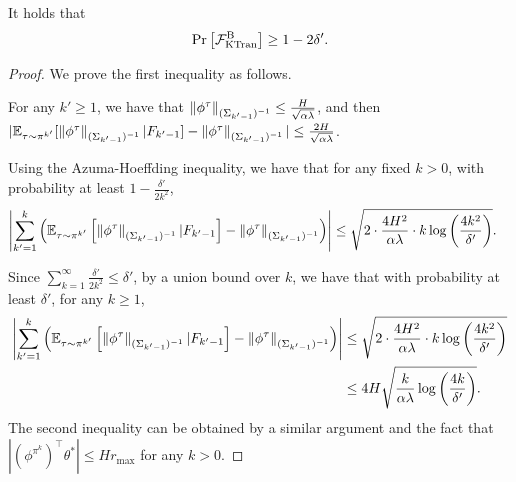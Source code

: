 \begin{lemma} \label{lemma:cF_binary}
	It holds that
	\begin{align*}
		\Pr \left[  \mathcal{F}^{\textup{B}}_{\textup{KTran}}  \right] \geq 1-2\delta' .
	\end{align*}
\end{lemma}
\begin{proof}
	We prove the first inequality as follows.
	
	For any $k'\geq 1$, we have that $\left\|  \phi^{\tau} \right\|_{(\Sigma_{k'-1})^{-1}} \leq \frac{H}{\sqrt{\alpha \lambda}}$, and then $|\mathbb{E}_{\tau \sim \pi^{k'}} [\left\|  \phi^{\tau} \right\|_{(\Sigma_{k'-1})^{-1}} | F_{k'-1}] - \left\|  \phi^{\tau} \right\|_{(\Sigma_{k'-1})^{-1}}| \leq \frac{2H}{\sqrt{\alpha \lambda}}$. 
	
	
	Using the Azuma-Hoeffding inequality, we have that for any fixed $k>0$, with probability at least $1-\frac{\delta'}{2k^2}$,
	\begin{align*}
		\left| \sum_{k'=1}^{k} \left(  \mathbb{E}_{\tau \sim \pi^{k'}}\left[  \left\|  \phi^{\tau} \right\|_{(\Sigma_{k'-1})^{-1}} | F_{k'-1} \right] - \left\|  \phi^{\tau} \right\|_{(\Sigma_{k'-1})^{-1}}  \right)  \right| &\leq \sqrt{ 2 \cdot \frac{4H^2}{\alpha \lambda} \cdot k \log\left( \frac{4k^2}{\delta'} \right) } .
	\end{align*}
	
	Since $\sum_{k=1}^{\infty} \frac{\delta'}{2k^2} \leq \delta'$, by a union bound over $k$, we have that with probability at least $\delta'$, for any $k\geq 1$,
	\begin{align*}
		\left| \sum_{k'=1}^{k} \left(  \mathbb{E}_{\tau \sim \pi^{k'}}\left[  \left\|  \phi^{\tau} \right\|_{(\Sigma_{k'-1})^{-1}} | F_{k'-1} \right] - \left\|  \phi^{\tau} \right\|_{(\Sigma_{k'-1})^{-1}}  \right)  \right| &\leq \sqrt{ 2 \cdot \frac{4H^2}{\alpha \lambda} \cdot k \log\left( \frac{4k^2}{\delta'} \right) } 
		\\
		&\leq 4H \sqrt{ \frac{k}{\alpha \lambda} \log\left( \frac{4k}{\delta'} \right) } .
	\end{align*}
	The second inequality can be obtained by a similar argument and the fact that $|(\phi^{\pi^{k}})^\top \theta^*| \leq Hr_{\max}$ for any $k>0$.
\end{proof}

